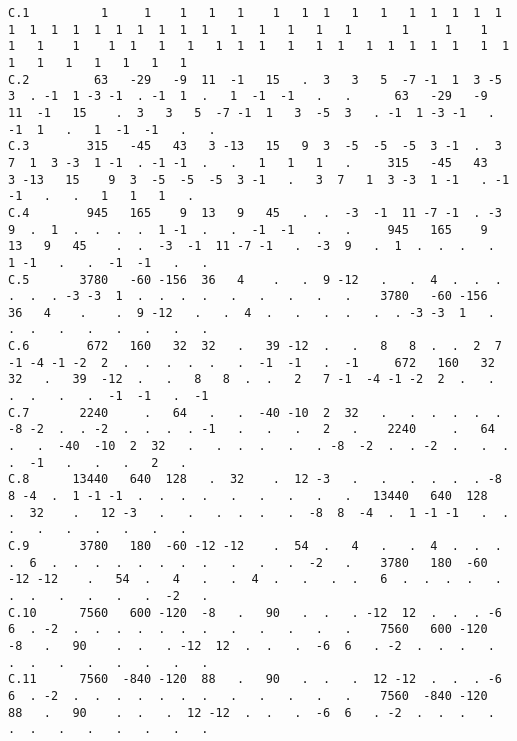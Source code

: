 \begin{verbatim}
C.1          1     1    1   1   1    1   1  1   1   1   1  1  1  1  1  1  1  1  1  1  1  1  1  1  1   1   1   1   1   1       1     1    1   1   1    1    1  1   1   1   1  1  1   1   1  1   1  1  1  1  1   1  1  1   1   1   1   1   1   1
C.2         63   -29   -9  11  -1   15   .  3   3   5  -7 -1  1  3 -5  3  . -1  1 -3 -1  . -1  1  .   1  -1  -1   .   .      63   -29   -9  11  -1   15    .  3   3   5  -7 -1  1   3  -5  3   . -1  1 -3 -1   . -1  1   .   1  -1  -1   .   .
C.3        315   -45   43   3 -13   15   9  3  -5  -5  -5  3 -1  .  3  7  1  3 -3  1 -1  . -1 -1  .   .   1   1   1   .     315   -45   43   3 -13   15    9  3  -5  -5  -5  3 -1   .   3  7   1  3 -3  1 -1   . -1 -1   .   .   1   1   1   .
C.4        945   165    9  13   9   45   .  .  -3  -1  11 -7 -1  . -3  9  .  1  .  .  .  .  1 -1  .   .  -1  -1   .   .     945   165    9  13   9   45    .  .  -3  -1  11 -7 -1   .  -3  9   .  1  .  .  .   .  1 -1   .   .  -1  -1   .   .
C.5       3780   -60 -156  36   4    .   .  9 -12   .   .  4  .  .  .  .  .  . -3 -3  1  .  .  .  .   .   .   .   .   .    3780   -60 -156  36   4    .    .  9 -12   .   .  4  .   .   .  .   .  . -3 -3  1   .  .  .   .   .   .   .   .   .
C.6        672   160   32  32   .   39 -12  .   .   8   8  .  .  2  7 -1 -4 -1 -2  2  .  .  .  .  .   .  -1  -1   .  -1     672   160   32  32   .   39  -12  .   .   8   8  .  .   2   7 -1  -4 -1 -2  2  .   .  .  .   .   .  -1  -1   .  -1
C.7       2240     .   64   .   .  -40 -10  2  32   .   .  .  .  .  . -8 -2  .  . -2  .  .  .  . -1   .   .   .   2   .    2240     .   64   .   .  -40  -10  2  32   .   .  .  .   .   . -8  -2  .  . -2  .   .  .  .  -1   .   .   .   2   .
C.8      13440   640  128   .  32    .  12 -3   .   .   .  .  .  . -8  8 -4  .  1 -1 -1  .  .  .  .   .   .   .   .   .   13440   640  128   .  32    .   12 -3   .   .   .  .  .   .  -8  8  -4  .  1 -1 -1   .  .  .   .   .   .   .   .   .
C.9       3780   180  -60 -12 -12    .  54  .   4   .   .  4  .  .  .  .  6  .  .  .  .  .  .  .  .   .   .   .  -2   .    3780   180  -60 -12 -12    .   54  .   4   .   .  4  .   .   .  .   6  .  .  .  .   .  .  .   .   .   .   .  -2   .
C.10      7560   600 -120  -8   .   90   .  .   . -12  12  .  .  . -6  6  . -2  .  .  .  .  .  .  .   .   .   .   .   .    7560   600 -120  -8   .   90    .  .   . -12  12  .  .   .  -6  6   . -2  .  .  .   .  .  .   .   .   .   .   .   .
C.11      7560  -840 -120  88   .   90   .  .   .  12 -12  .  .  . -6  6  . -2  .  .  .  .  .  .  .   .   .   .   .   .    7560  -840 -120  88   .   90    .  .   .  12 -12  .  .   .  -6  6   . -2  .  .  .   .  .  .   .   .   .   .   .   .

\end{verbatim}
